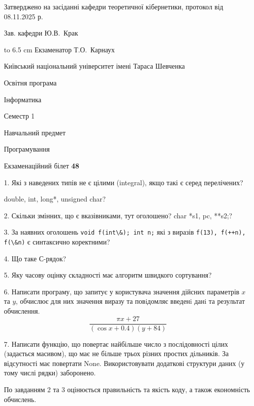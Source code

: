 \documentclass[12pt, ukrainian]{article}
\def\code#1{\Verb!#1!}
\begin{document}
{\smallskip\smallskip \begin {scriptsize} Затверджено на засіданні кафедри теоретичної кібернетики, протокол   від   08.11.2025 р.\par\smallskip\smallskip\smallskip\smallskip
{\parbox {6.5 cm} {Зав. кафедри \dotfill Ю.В.~Крак}}\hspace {0.7cm} {\hbox to 6.5 cm { Екзаменатор \dotfill Т.О.~Карнаух}} \end{scriptsize}}
\vspace{0.9cm}
{{\begin {scriptsize}\par
{ \center  Київський національний університет імені Тараса Шевченка \par}
{\parbox {5 cm}{Освітня програма \hfill}{\parbox {7 cm}{Інформатика\hfill}}\parbox {6 cm}{\hfill Семестр 1}}\par
{\parbox {5 cm} {Навчальний предмет \hfill}\parbox {7 cm}{Програмування \hfill}\parbox {6cm}{\hfill}\par}\vspace{-15pt} \end{scriptsize}}{\center Екзаменаційний білет \No \textbf { 48 }\par}}
{%
1. Які з наведених типів не є цілими (integral), якщо такі є серед перелічених?

double, int, long*, unsigned char?
\par
\vspace{2mm}
2. Скільки змінних, що є вказівниками, тут оголошено?
char *s1, pc, **s2;?
\par
\vspace{2mm}
3. За наявних оголошень \code{void f(int\&); int n;} які з виразів \code{f(13), f(++n), f(\&n)} є синтаксично коректними?
\par
\vspace{2mm}
4. Що таке С-рядок?
\par
\vspace{2mm}
5. Яку часову оцінку складності має алгоритм швидкого сортування?
\par
\vspace{2mm}
6. Написати програму, що запитує у користувача значення дійсних параметрів $x$ та $y$, обчислює для них значення виразу та повiдомляє введенi данi та результат обчислення.
$$\frac{\pi x + 27}{(\cos x + 0.4) (y + 84)}$$ 

\par
7. Написати функцію, що повертає найбільше число з послідовності цілих (задається масивом), що має не більше трьох різних простих дільників. За відсутності має повертати None. Використовувати додаткові структури даних (у тому числі рядки) заборонено.

По завданням 2 та 3 оцінюється правильність та якість коду, а також економність обчислень.

}
\end{document}
